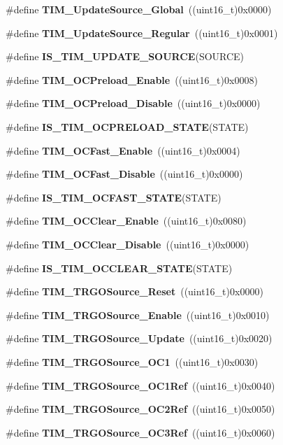 \begin{DoxyCompactItemize}
\#define \textbf{ T\+I\+M\+\_\+\+Update\+Source\+\_\+\+Global}~((uint16\+\_\+t)0x0000)
\item 
\#define \textbf{ T\+I\+M\+\_\+\+Update\+Source\+\_\+\+Regular}~((uint16\+\_\+t)0x0001)
\item 
\#define \textbf{ I\+S\+\_\+\+T\+I\+M\+\_\+\+U\+P\+D\+A\+T\+E\+\_\+\+S\+O\+U\+R\+CE}(S\+O\+U\+R\+CE)
\item 
\#define \textbf{ T\+I\+M\+\_\+\+O\+C\+Preload\+\_\+\+Enable}~((uint16\+\_\+t)0x0008)
\item 
\#define \textbf{ T\+I\+M\+\_\+\+O\+C\+Preload\+\_\+\+Disable}~((uint16\+\_\+t)0x0000)
\item 
\#define \textbf{ I\+S\+\_\+\+T\+I\+M\+\_\+\+O\+C\+P\+R\+E\+L\+O\+A\+D\+\_\+\+S\+T\+A\+TE}(S\+T\+A\+TE)
\item 
\#define \textbf{ T\+I\+M\+\_\+\+O\+C\+Fast\+\_\+\+Enable}~((uint16\+\_\+t)0x0004)
\item 
\#define \textbf{ T\+I\+M\+\_\+\+O\+C\+Fast\+\_\+\+Disable}~((uint16\+\_\+t)0x0000)
\item 
\#define \textbf{ I\+S\+\_\+\+T\+I\+M\+\_\+\+O\+C\+F\+A\+S\+T\+\_\+\+S\+T\+A\+TE}(S\+T\+A\+TE)
\item 
\#define \textbf{ T\+I\+M\+\_\+\+O\+C\+Clear\+\_\+\+Enable}~((uint16\+\_\+t)0x0080)
\item 
\#define \textbf{ T\+I\+M\+\_\+\+O\+C\+Clear\+\_\+\+Disable}~((uint16\+\_\+t)0x0000)
\item 
\#define \textbf{ I\+S\+\_\+\+T\+I\+M\+\_\+\+O\+C\+C\+L\+E\+A\+R\+\_\+\+S\+T\+A\+TE}(S\+T\+A\+TE)
\item 
\#define \textbf{ T\+I\+M\+\_\+\+T\+R\+G\+O\+Source\+\_\+\+Reset}~((uint16\+\_\+t)0x0000)
\item 
\#define \textbf{ T\+I\+M\+\_\+\+T\+R\+G\+O\+Source\+\_\+\+Enable}~((uint16\+\_\+t)0x0010)
\item 
\#define \textbf{ T\+I\+M\+\_\+\+T\+R\+G\+O\+Source\+\_\+\+Update}~((uint16\+\_\+t)0x0020)
\item 
\#define \textbf{ T\+I\+M\+\_\+\+T\+R\+G\+O\+Source\+\_\+\+O\+C1}~((uint16\+\_\+t)0x0030)
\item 
\#define \textbf{ T\+I\+M\+\_\+\+T\+R\+G\+O\+Source\+\_\+\+O\+C1\+Ref}~((uint16\+\_\+t)0x0040)
\item 
\#define \textbf{ T\+I\+M\+\_\+\+T\+R\+G\+O\+Source\+\_\+\+O\+C2\+Ref}~((uint16\+\_\+t)0x0050)
\item 
\#define \textbf{ T\+I\+M\+\_\+\+T\+R\+G\+O\+Source\+\_\+\+O\+C3\+Ref}~((uint16\+\_\+t)0x0060)
\item 

\end{DoxyCompactItemize}
